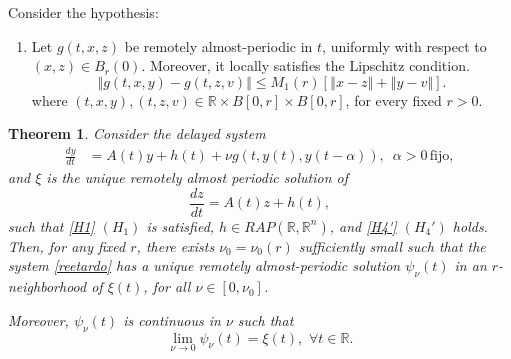 \documentclass[english,reqno]{amsart}
\numberwithin{equation}{section}
\theoremstyle{plain}
\newtheorem{thm}{Theorem}[section]
\theoremstyle{definition}
\theoremstyle{remark}
\begin{document}
Consider the hypothesis:

\begin{enumerate}[label=(\textbf{H.4'})]%
\item\label{H4'} Let $g\left(t,x,z\right)$ be remotely almost-periodic in $t$, uniformly with respect to $\left(x,z\right)\in B_r(0)$. Moreover, it locally satisfies the Lipschitz condition.
\[
\left\Vert g\left(t,x,y\right)-g\left(t,z,v\right)\right\Vert \leq M_{1}\left(r\right)\left[\left\Vert x-z\right\Vert +\left\Vert y-v\right\Vert \right].
\]
where $\left(t,x,y\right),\left(t,z,v\right)\in\mathbb{R}\times B\left[0,r\right]\times B\left[0,r\right]$, for every fixed $r>0$.
\end{enumerate}


\begin{thm}\label{perturbado_retardo_lineal}
Consider the delayed system
\begin{align}
\frac{dy}{dt} & =A\left(t\right)y+h\left(t\right)+\nu g\left(t,y\left(t\right),y\left(t-\alpha\right)\right),\,\,\,\alpha>0\,\mbox{fijo},\label{reetardo}
\end{align}
and $\xi$ is the unique remotely almost periodic solution of 
\begin{equation}
\frac{dz}{dt}=A\left(t\right)z+h\left(t\right), \label{generador}
\end{equation}
such that \ref{H1} $\left(H_{1}\right)$ is satisfied, $h\in RAP(\mathbb{R},\mathbb{R}^n)$, and \ref{H4'} $\left(H_{4}'\right)$ holds.  
Then, for any fixed $r$, there exists $\nu_{0}=\nu_{0}\left(r\right)$ sufficiently small such that the system \eqref{reetardo} has a unique remotely almost-periodic solution $\psi_{\nu}\left(t\right)$ in an $r$-neighborhood of $\xi\left(t\right)$, for all $\nu\in\left[0,\nu_{0}\right]$.

Moreover, $\psi_{\nu}\left(t\right)$ is continuous in $\nu$ such that  
\[
\lim_{\nu\rightarrow0}\psi_{\nu}\left(t\right)=\xi(t), \,\, \forall t \in \mathbb{R}.
\]
\end{thm}
\end{document}
